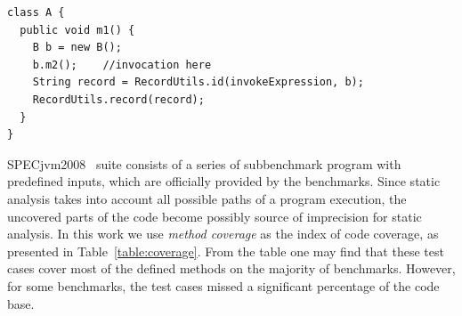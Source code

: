\documentclass{fac}
\begin{document}
\begin{minipage}{\linewidth}
\vspace{10pt}
\begin{lstlisting}[caption={Example code after our instrumentation},label={lst:after-instru}]
class A {
  public void m1() {
    B b = new B();
    b.m2();    //invocation here
    String record = RecordUtils.id(invokeExpression, b);
    RecordUtils.record(record);
  }
}
\end{lstlisting}
\end{minipage}

SPECjvm2008~\cite{specjvm} suite consists of a series of subbenchmark program with predefined inputs, which are officially provided by the benchmarks. Since static analysis takes into account all possible paths of a program execution, the uncovered parts of the code become possibly source of imprecision for static analysis. In this work we use \emph{method coverage} as the index of code coverage, as presented in Table~\ref{table:coverage}. From the table one may find that these test cases cover most of the defined methods on the majority of benchmarks. However, for some benchmarks, the test cases missed a significant percentage of the code base. %
\end{document}
